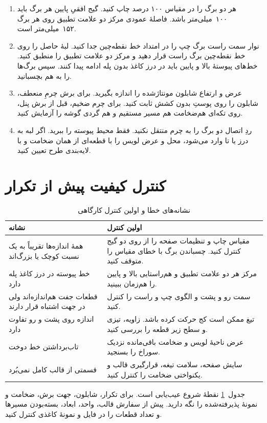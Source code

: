 \begin{enumerate}
  \item هر دو برگ را در مقیاس ۱۰۰ درصد چاپ کنید. گیج افقیِ پایین هر برگ باید ۱۰۰~میلی‌متر باشد. فاصلۀ عمودی مرکز دو علامت تطبیق روی هر برگ ۱۵۲~میلی‌متر است.
  \item نوار سمت راست برگ چپ را در امتداد خط نقطه‌چین جدا کنید. لبۀ حاصل را روی خط نقطه‌چین برگ راست قرار دهید و مرکز دو علامت تطبیق را منطبق کنید. خط‌های پیوستۀ بالا و پایین باید در درز کاغذ بدون پله ادامه پیدا کنند. سپس برگ‌ها را به هم بچسبانید.
  \item عرض و ارتفاع شابلون مونتاژشده را اندازه بگیرید. برای برش چرمِ منعطف، شابلون را روی پوستِ بدون کشش ثابت کنید. برای چرم ضخیم، قبل از برش پنل، روی تکه‌ای هم‌ضخامت هم مسیر مستقیم و هم گردی گوشه را آزمایش کنید.
  \item ردِ اتصال دو برگ را به چرم منتقل نکنید. فقط محیط پیوسته را ببرید. اگر لبه به درز یا تا وارد می‌شود، محل و عرض لویس را با قطعه‌ای از همان ضخامت و با لایه‌بندی طرح تعیین کنید.
\end{enumerate}

\section{کنترل کیفیت پیش از تکرار}

\begin{table}[!htbp]
  \centering
  \caption{نشانه‌های خطا و اولین کنترل کارگاهی}
  \label{tab:checks}
  \begin{tabular}{@{}p{48mm}p{98mm}@{}}
    \toprule
    نشانه & اولین کنترل \\
    \midrule
    همۀ اندازه‌ها تقریباً به یک نسبت کوچک یا بزرگ‌اند & مقیاس چاپ و تنظیمات صفحه را از روی دو گیج کنترل کنید. چسباندن برگ با خطای مقیاس را متوقف کنید. \\
    خط پیوسته در درز کاغذ پله دارد & مرکز هر دو علامت تطبیق و هم‌راستایی بالا و پایین را هم‌زمان ببینید. \\
    قطعات جفت هم‌اندازه‌اند ولی در جهت اشتباه قرار دارند & سمت رو و پشت و الگوی چپ و راست را کنترل کنید. \\
    اندازه روی پشت و رو تفاوت دارد & تیغ ممکن است کج حرکت کرده باشد. زاویه، تیزی و سطح زیر قطعه را بررسی کنید. \\
    تاب‌برداشتن خط دوخت & عرض ناحیۀ لویس و ضخامت باقی‌مانده نزدیک سوراخ را بسنجید. \\
    قسمتی از قالب کامل نمی‌بُرد & سایش صفحه، سلامت تیغه، قرارگیری قالب و یکنواختی ضخامت را کنترل کنید. \\
    \bottomrule
  \end{tabular}
\end{table}

جدول~\ref{tab:checks} نقطۀ شروع عیب‌یابی است. برای تکرار، شابلون، جهت برش، ضخامت و نمونۀ پذیرفته‌شده را نگه دارید. پیش از سفارش قالب، واحد، ابعاد، بسته‌بودن مسیرها و تعداد قطعات را در فایل و نمونۀ کاغذی کنترل کنید.
